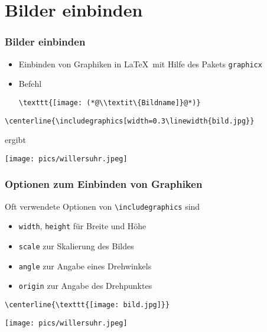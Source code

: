 \section{Bilder einbinden}

\begin{frame}[fragile]
  \frametitle{Bilder einbinden}

  \onslide<+->

  \begin{itemize}
  \item Einbinden von Graphiken in \LaTeX\ mit Hilfe des Pakets \texttt{graphicx}
  \item Befehl
\begin{lstlisting}
\texttt{[image: (*@\\textit\{Bildname]}@*)}
\end{lstlisting}
  \end{itemize}

  \onslide<+->

  \begin{Beispiel}
\begin{lstlisting}
\centerline{\includegraphics[width=0.3\linewidth{bild.jpg}}
\end{lstlisting}%

    ergibt

    \centerline{\texttt{[image: pics/willersuhr.jpeg]}} %
  \end{Beispiel}

\end{frame}

\begin{frame}[fragile]
  \frametitle{Optionen zum Einbinden von Graphiken}

  \onslide<+->

  Oft verwendete Optionen von \lstinline{\includegraphics} sind
  \begin{itemize}
    \item \texttt{width}, \texttt{height} für Breite und Höhe
    \item \texttt{scale} zur Skalierung des Bildes
    \item \texttt{angle} zur Angabe eines Drehwinkels
    \item \texttt{origin} zur Angabe des Drehpunktes
  \end{itemize}

  \onslide<+->

  \begin{Beispiel}
\begin{lstlisting}
\centerline{\texttt{[image: bild.jpg]}}
\end{lstlisting}

    \centerline{\texttt{[image: pics/willersuhr.jpeg]}}
  \end{Beispiel}

\end{frame}

